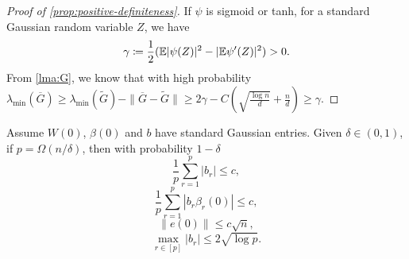 \begin{proof}[Proof of \cref{prop:positive-definiteness}]
If $\psi$ is sigmoid or tanh, for a standard Gaussian random variable $Z$, we have
\begin{equation*}
    \gamma\coloneqq \frac{1}{2}(\mathbb{E}|\psi(Z)|^2-|\mathbb{E}\psi'(Z)|^2) >0.
\end{equation*}
From \cref{lma:G}, we know that with high probability $\lambda_{\min}(\overline{G}) \geq \lambda_{\min}(\widetilde{G})-\|\overline{G}-\widetilde{G}\|\geq 2\gamma - C(\sqrt{\frac{\log n}{d}} + \frac{n}{d}) \geq \gamma$.
\end{proof}

\begin{lemma}
\label{lma:inqs}
Assume $W(0)$, $\beta(0)$ and $b$ have \iid standard Gaussian entries. Given $\delta\in(0,1)$, if $p=\Omega(n/\delta)$, then with probability $1-\delta$
\begin{equation}\label{eq:sumb_bd}
    \frac{1}{p}\sum_{r=1}^p|b_r| \leq c,
\end{equation}
\begin{equation}\label{eq:sumbbet_bd}
    \frac{1}{p}\sum_{r=1}^p|b_r\beta_r(0)| \leq c,
\end{equation}
\begin{equation}\label{eq:e0_bd}
    \|e(0)\| \leq c\sqrt n,
\end{equation}
\begin{equation}\label{eq:maxb_bd}
    \max_{r\in[p]}|b_r|\leq 2\sqrt{\log p}.
\end{equation}
\end{lemma}
